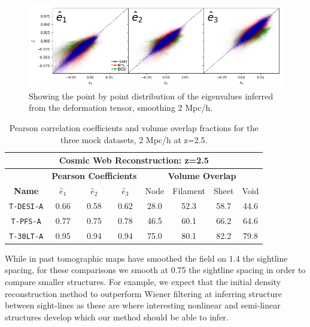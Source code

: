 \documentclass[times]{aastex62}
\begin{document}
\begin{figure}
  \centering 
  
  \includegraphics[trim=1cm 0cm 0cm 0cm,width=1.0\textwidth]{./figs_treepm/eigenvalues_z=2.png}
    \caption{Showing the point by point distribution of the eigenvalues inferred from the deformation tensor, smoothing 2 Mpc/h.} 
    \label{fig_eigenvalues}
\end{figure}

\begin{table}
  \begin{center}
    \label{tab:table1}
    \begin{tabular}{c|c|c|c|c|c|c|c} 
    
\multicolumn{8}{|c||}{\textbf{Cosmic Web Reconstruction: z=2.5}}
 \\ 
          \hline
      \hline

& \multicolumn{3}{|c||}{\textbf{Pearson Coefficients}} & \multicolumn{4}{|c||}{\textbf{Volume Overlap}} 
 \\ 
      \hline
      \textbf{Name}& $\hat{e}_1$ &  $\hat{e}_2$ & $\hat{e}_3$ & Node & Filament & Sheet & Void\\
      \hline
      \hline


        \texttt{T-DESI-A} & 0.66 & 0.58 & 0.62 & 28.0 & 52.3 & 58.7 & 44.6\\
        \texttt{T-PFS-A}& 0.77 & 0.75 & 0.78 & 46.5 & 60.1 & 66.2 & 64.6 \\
        \texttt{T-30LT-A} & 0.95 & 0.94 & 0.94 & 75.0 & 80.1 & 82.2 & 79.8\\
    \end{tabular}
        \caption{Pearson correlation coefficients and volume overlap fractions for the three mock datasets, 2 Mpc/h at z=2.5.}

  \end{center}
\end{table}

While in past tomographic maps \cite{Lee2017} have smoothed the field on $1.4$ the sightline spacing, for these comparisons we smooth at 0.75 the sightline spacing in order to compare smaller structures. For example, we expect that the initial density reconstruction method to outperform Wiener filtering at inferring structure between sight-lines as these are where interesting nonlinear and semi-linear structures develop which our method should be able to infer. 
\end{document}
